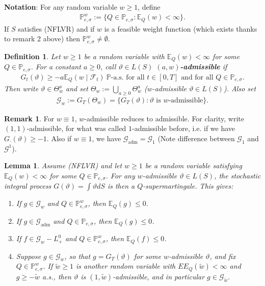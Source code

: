 \documentclass[12pt,a4paper, twoside]{article}
\newtheorem{lem}{Lemma}[section]
\newtheorem{defn}{Definition}[section]
\theoremstyle{definition}
\newtheorem{rem}{Remark}[section]
\newcommand{\EE}{\mathbb{E}} %
\newcommand{\PP}{\mathbb{P}} %
\begin{document}
\newpage
\noindent \textbf{Notation}: For any random variable $w \geq 1$, define 
\begin{align*}
\PP_{e, \sigma}^w := \{ Q \in \PP_{e, \sigma} : \EE_Q(w) < \infty \}.
\end{align*}
If $S$ satisfies (NFLVR) and if $w$ is a feasible weight function (which exists thanks to remark 2 above) then $\PP_{e, \sigma}^w \neq \emptyset$.
\begin{defn} Let $w \geq 1$ be a random variable with $\EE_Q(w) < \infty$ for some $Q \in \PP_{e,  \sigma}$. For a constant $a \geq 0$, call $\vartheta \in L(S)$ \textbf{$(a,w)$-admissible} if 
\begin{align*}
G_t( \vartheta) \geq -a \EE_Q(w \mid \mathcal{F}_t) \ \PP\text{-a.s. for all } t \in [0,T] \text{ and for all } Q \in \PP_{e, \sigma}. 
\end{align*}
Then write $\vartheta \in \Theta_w^a$ and set $\Theta_w:= \bigcup_{a \geq 0 } \Theta_w^a$ ($w$-admissible $\vartheta \in L(S)$). Also set
\begin{align*}
\mathcal{G}_w:= G_T( \Theta_w)= \{ G_T( \vartheta) : \vartheta \text{ is $w$-admissible}\}.
\end{align*}
\end{defn}
\begin{rem} For $w \equiv 1$, $w$-admissible reduces to admissible. For clarity, write $(1,1)$-admissible, for what was called $1$-admissible before,  i.e. if we have $G_\cdot ( \vartheta) \geq -1$. Also if $w \equiv 1$, we have $\mathcal{G}_\text{adm}= \mathcal{G}_1$ (Note difference between $\mathcal{G}_1$ and $\mathcal{G}^1$). 
\end{rem}
\begin{lem} \label{L81} Assume (NFLVR) and let $w \geq 1$ be a random variable satisfying $\mathbb{E}_Q(w) < \infty$ for some $Q \in \PP_{e, \sigma}.$ For any $w$-admissible $\vartheta \in L(S)$, the stochastic integral process $G( \vartheta) = \int \vartheta dS$ is then a $Q$-supermartingale. This gives:
\begin{enumerate}
\item If $g \in \mathcal{G}_w$ and $Q \in \PP_{e, \sigma}^w$, then $\EE_Q(g) \leq 0$. 
\item If $g \in \mathcal{G}_\text{adm}$ and $Q \in \PP_{e, \sigma}$, then $\EE_Q(g) \leq 0$. 
\item If $f \in \mathcal{G}_w-L_+^0$ and $Q \in \PP_{e, \sigma}^w$, then $\EE_Q(f) \leq 0$. 
\item Suppose $g \in \mathcal{G}_w$, so that $g= G_T( \vartheta)$ for some $w$-admissible $\vartheta$, and fix $Q \in \PP_{e, \sigma}^w$. If $\widetilde{w} \geq 1$ is another random variable with $EE_Q( \widetilde{w}) < \infty$ and $g \geq - \widetilde{w}$ a.s., then $\vartheta$ is $(1, \widetilde{w})$-admissible, and in particular $g \in \mathcal{G}_{\widetilde{w}}.$
\end{enumerate}
\end{lem}
\end{document}
